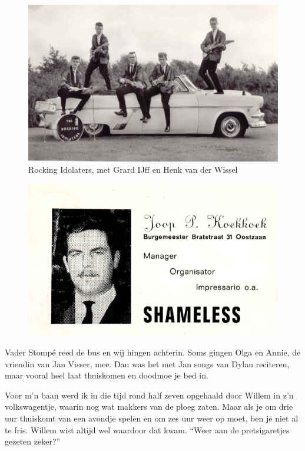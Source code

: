 \documentclass[12pt,twoside, openright]{memoir}
\begin{document}
\begin{figure}
\centering
\includegraphics[width=\textwidth]{img/ch25/ri-2}
\caption*{\footnotesize Rocking Idolaters, met Grard IJff en Henk van der Wissel}
\end{figure}

\begin{figure}
\centering
\includegraphics[width=\textwidth]{img/169JoopB}
\end{figure}

Vader Stompé reed de bus en wij hingen achterin. Soms gingen Olga en Annie, de vriendin van Jan Visser, mee. Dan was het met Jan songs van Dylan reciteren, maar vooral heel laat thuiskomen en doodmoe je bed in.

Voor m'n baan werd ik in die tijd rond half zeven opgehaald door Willem in z’n volkswagentje, waarin nog wat makkers van de ploeg zaten. Maar als je om drie uur thuiskomt van een avondje spelen en om zes uur weer op moet, ben je niet al te fris. Willem wist altijd wel waardoor dat kwam. ``Weer aan de pretsigaretjes gezeten zeker?''
\end{document}

